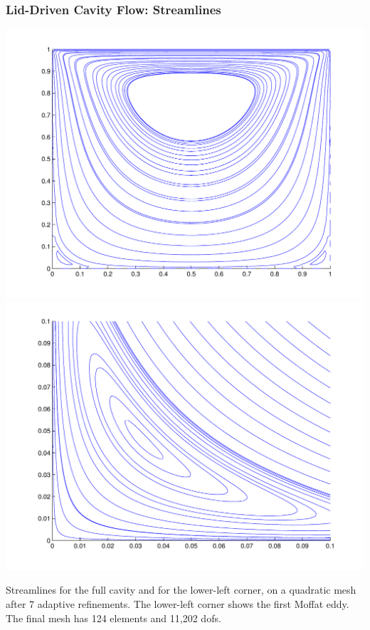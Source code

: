 \documentclass[mathserif]{beamer}
\begin{document}
\begin{frame}
\frametitle{Lid-Driven Cavity Flow: Streamlines}
\begin{center}
{\setlength{\fboxsep}{1pt}\colorbox{pecos2}{\includegraphics[scale=0.25]{../figures/streamlines_p2_r7.pdf}}} \hspace{5mm} {\setlength{\fboxsep}{1pt}\colorbox{pecos2}{\includegraphics[scale=0.25]{../figures/streamlines_detail_p2_r7.pdf}}}
\end{center}
Streamlines for the full cavity and for the lower-left corner, on a quadratic mesh after 7 adaptive refinements.  The lower-left corner shows the first Moffat eddy.  The final mesh has 124 elements and 11,202 dofs.
\end{frame}
\end{document}
